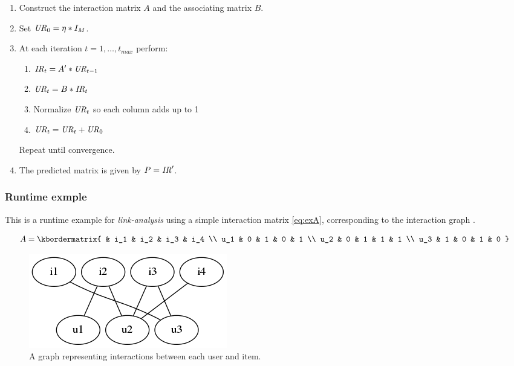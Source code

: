 \begin{enumerate}
    \item Construct the interaction matrix $A$ and the associating matrix $B$.

    \item Set $\mathit{UR}_0 = \eta * I_M$.
    \item At each iteration $t = 1, \ldots, t_{max}$ perform:

        \begin{enumerate}
            \item $\mathit{IR}_t = A' * \mathit{UR}_{t- 1}$
            \item $\mathit{UR}_t = B * \mathit{IR}_t$
            \item Normalize $\mathit{UR}_t$ so each column adds up to 1
            \item $\mathit{UR}_t = \mathit{UR}_t + \mathit{UR}_0$
        \end{enumerate}

        Repeat until convergence.

    \item The predicted matrix is given by $P = \mathit{IR}'$.

\end{enumerate}


\subsubsection{Runtime exmple}

This is a runtime example for \textit{link-analysis} using a simple interaction matrix \eqref{eq:exA}, corresponding to the interaction graph .

\begin{equation}\label{eq:exA}
  A = \kbordermatrix{
    &    i_1 & i_2 & i_3 & i_4 \\
    u_1 & 0   & 1   & 0   & 1  \\
    u_2 & 0   & 1   & 1   & 1  \\
    u_3 & 1   & 0   & 1   & 0
  }
\end{equation}

\begin{figure}[h!]
    \centering
    \includegraphics[width=0.3\linewidth]{fig/example_run/item_user_graph.png}
    \caption{A graph representing interactions between each user and item.}
    \label{fig:ex_graph}
\end{figure}

